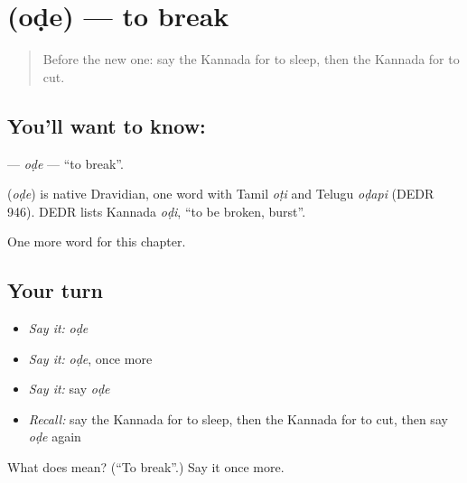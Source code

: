 \section[\texorpdfstring{\kn{ಒಡೆ} (oḍe)}{ಒಡೆ (oḍe)}]{ (oḍe) — to break}

\label{lesson:KA-C147-ode}



\begin{quote}
Before the new one: say the Kannada for to sleep, then the Kannada for to cut.
\end{quote}

\subsection*{You'll want to know: }
\textbf{} — \emph{oḍe} — \textquotedblleft{}to break\textquotedblright{}.

\begin{cousinweb}
\textbf{} (\emph{oḍe}) is native Dravidian, one word with Tamil \emph{oṭi} and Telugu \emph{oḍapi} (DEDR 946). DEDR lists Kannada \emph{oḍi}, \textquotedblleft{}to be broken, burst\textquotedblright{}.
\end{cousinweb}

\begin{grammarlens}[title={What you've built}]
One more word for this chapter.
\end{grammarlens}

\subsection*{Your turn}
\begin{itemize}
\raggedright
  \item \emph{Say it:} \emph{oḍe}
  \item \emph{Say it:} \emph{oḍe}, once more
  \item \emph{Say it:} say \emph{oḍe}
  \item \emph{Recall:} say the Kannada for to sleep, then the Kannada for to cut, then say \emph{oḍe} again
\end{itemize}

\begin{tcolorbox}[breakable,colback=teal!4,colframe=teal!35!black,title={Before you move on}]
What does  mean? (\textquotedblleft{}To break\textquotedblright{}.) Say it once more.
\end{tcolorbox}
